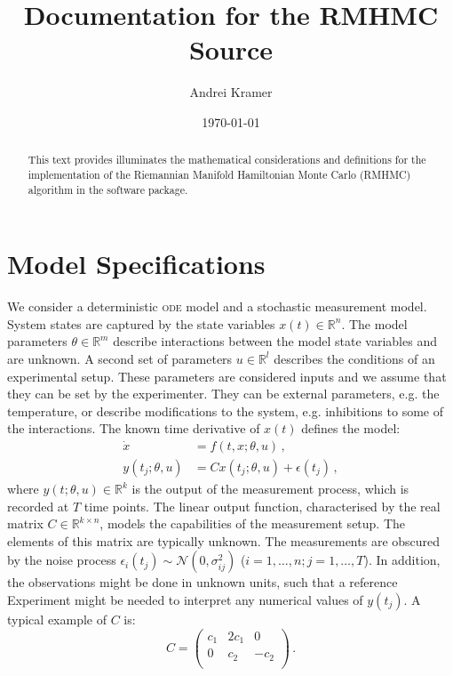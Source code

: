 \documentclass[utf8,english]{scrartcl}
\title{Documentation for the RMHMC Source}
\author{Andrei Kramer}
\date{\today}
\newcommand{\ode}{\textsc{ode}}
\begin{document}
\maketitle
\begin{abstract}
  This text provides illuminates the mathematical considerations and
  definitions for the implementation of the Riemannian Manifold
  Hamiltonian Monte Carlo (RMHMC) algorithm in the software package.
\end{abstract}

\section{Model Specifications}
\label{sec:odeModel}

We consider a deterministic \ode{} model and a stochastic measurement
model. System states are captured by the state variables
$x(t)\in\mathbb{R}^n$. The model parameters $\theta\in\mathbb{R}^m$
describe interactions between the model state variables and are
unknown. A second set of parameters $u\in\mathbb{R}^l$ describes the
conditions of an experimental setup. These parameters are considered
inputs and we assume that they can be set by the experimenter. They
can be external parameters, e.g. the temperature, or describe
modifications to the system, e.g. inhibitions to some of the
interactions. The known time derivative of $x(t)$ defines the model:
\begin{align}
  \dot x &= f(t,x;\theta,u)\,,\\
  y(t_j;\theta,u)&=C x(t_j;\theta,u) + \epsilon(t_j)\,,
\end{align}
where $y(t;\theta,u)\in\mathbb{R}^k$ is the output of the measurement
process, which is recorded at $T$ time points. The linear output
function, characterised by the real matrix $C\in\mathbb{R}^{k\times
  n}$, models the capabilities of the measurement setup. The elements
of this matrix are typically unknown. The measurements are obscured by
the noise process $\epsilon_i(t_j)\sim\mathcal{N}(0,\sigma^2_{ij})$
($i=1,\dots,n; j=1,\dots,T$). In addition, the observations might be
done in unknown units, such that a reference Experiment might be
needed to interpret any numerical values of $y(t_j)$. A typical
example of $C$ is:
\begin{equation}
  C=
  \begin{pmatrix}
    c_1&2c_1&0\\
    0&c_2&-c_2\\
  \end{pmatrix}\,.
\end{equation}
\end{document}
